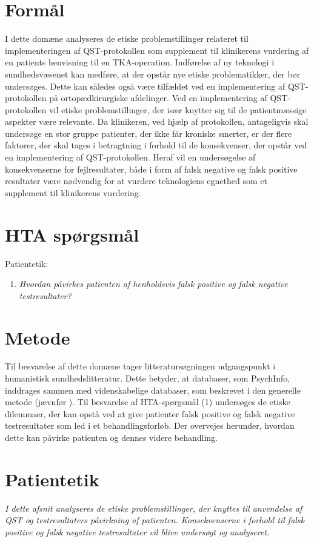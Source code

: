 \section{Formål}
I dette domæne analyseres de etiske problemstillinger relateret til implementeringen af QST-protokollen som supplement til klinikerens vurdering af en patients henvisning til en TKA-operation. Indførelse af ny teknologi i sundhedsvæsenet kan medføre, at der opstår nye etiske problematikker, der bør undersøges. Dette kan således også være tilfældet ved en implementering af QST-protokollen på ortopædkirurgiske afdelinger. Ved en implementering af QST-protokollen vil etiske problemstillinger, der især knytter sig til de patientmæssige aspekter være relevante. Da klinikeren, ved hjælp af protokollen, antageligvis skal undersøge en stor gruppe patienter, der ikke får kroniske smerter, er der flere faktorer, der skal tages i betragtning i forhold til de konsekvenser, der opstår ved en implementering af QST-protokollen. Heraf vil en undersøgelse af konsekvenserne for fejlresultater, både i form af falsk negative og falsk positive resultater være nødvendig for at vurdere teknologiens egnethed som et supplement til klinikerens vurdering.

\section{HTA spørgsmål}
Patientetik:
\begin{enumerate}
\item \textit{Hvordan påvirkes patienten af henholdsvis falsk positive og falsk negative testresultater?} %
\end{enumerate}

\section{Metode}
Til besvarelse af dette domæne tager litteratursøgningen udgangspunkt i humanistisk sundhedslitteratur. Dette betyder, at databaser, som PsychInfo, inddrages sammen med videnskabelige databaser, som beskrevet i den generelle metode (jævnfør ). 
Til besvarelse af HTA-spørgsmål (1) undersøges de etiske dilemmaer, der kan opstå ved at give patienter falsk positive og falsk negative testresultater som led i et behandlingsforløb. Der overvejes herunder, hvordan dette kan påvirke patienten og dennes videre behandling.

\section{Patientetik}
\textit{I dette afsnit analyseres de etiske problemstillinger, der knyttes til anvendelse af QST og testresultaters påvirkning af patienten. Konsekvenserne i forhold til falsk positive og falsk negative testresultater vil blive undersøgt og analyseret.}

